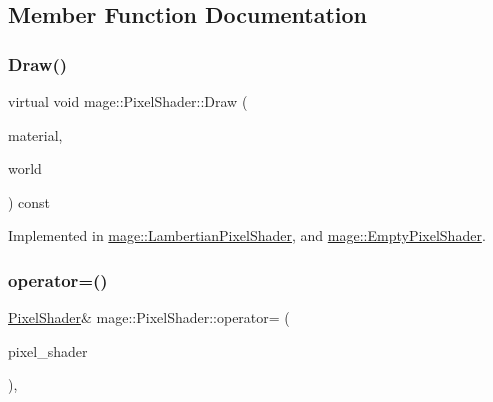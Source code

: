 \subsection{Member Function Documentation}
\hypertarget{classmage_1_1_pixel_shader_ac7662093a83213881698dca25f8215a2}{}\label{classmage_1_1_pixel_shader_ac7662093a83213881698dca25f8215a2} 
\subsubsection{\texorpdfstring{Draw()}{Draw()}}
{\footnotesize\ttfamily virtual void mage\+::\+Pixel\+Shader\+::\+Draw (\begin{DoxyParamCaption}\item[{const \hyperlink{structmage_1_1_material}{Material} \&}]{material,  }\item[{const \hyperlink{classmage_1_1_world}{World} \&}]{world }\end{DoxyParamCaption}) const\hspace{0.3cm}{\ttfamily [pure virtual]}}



Implemented in \hyperlink{classmage_1_1_lambertian_pixel_shader_a7394a51578de77cd7e57b9bd63895ffd}{mage\+::\+Lambertian\+Pixel\+Shader}, and \hyperlink{classmage_1_1_empty_pixel_shader_ababff79ea9746a94b838bb2f8dfd1fbf}{mage\+::\+Empty\+Pixel\+Shader}.

\hypertarget{classmage_1_1_pixel_shader_ac3a3535b2751237f4aad110dca05d0c3}{}\label{classmage_1_1_pixel_shader_ac3a3535b2751237f4aad110dca05d0c3} 
\subsubsection{\texorpdfstring{operator=()}{operator=()}\hspace{0.1cm}{\footnotesize\ttfamily [1/2]}}
{\footnotesize\ttfamily \hyperlink{classmage_1_1_pixel_shader}{Pixel\+Shader}\& mage\+::\+Pixel\+Shader\+::operator= (\begin{DoxyParamCaption}\item[{const \hyperlink{classmage_1_1_pixel_shader}{Pixel\+Shader} \&}]{pixel\+\_\+shader }\end{DoxyParamCaption})\hspace{0.3cm}{\ttfamily [private]}, {\ttfamily [delete]}}

